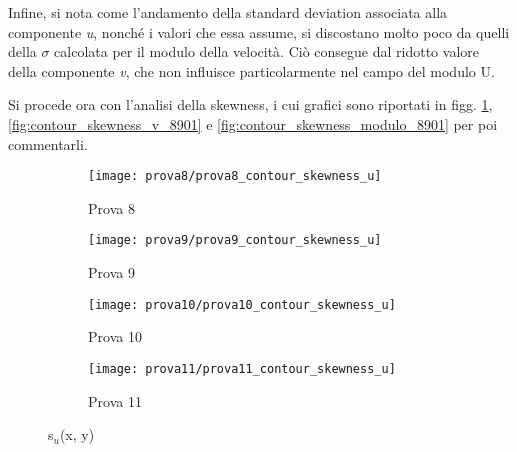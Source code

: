 \documentclass{article} %
\begin{document}
Infine, si nota come l'andamento della standard deviation associata alla componente \textit{u}, nonché i valori che essa assume, si discostano molto poco da quelli della $\sigma$ calcolata per il modulo della velocità. Ciò consegue dal ridotto valore della componente \textit{v}, che non influisce particolarmente nel campo del modulo U.\par
Si procede ora con l'analisi della skewness, i cui grafici sono riportati in figg. \ref{fig:contour_skewness_u_8901}, \ref{fig:contour_skewness_v_8901} e \ref{fig:contour_skewness_modulo_8901} per poi commentarli.
\begin{figure}[h!]
	\centering
	\begin{subfigure}[b]{0.24\textwidth}
		\texttt{[image: prova8/prova8\_contour\_skewness\_u]}
		\caption{Prova 8}
	\end{subfigure}
	\begin{subfigure}[b]{0.24\textwidth}
		\texttt{[image: prova9/prova9\_contour\_skewness\_u]}
		\caption{Prova 9}
	\end{subfigure}
	\begin{subfigure}[b]{0.24\textwidth}
		\texttt{[image: prova10/prova10\_contour\_skewness\_u]}
		\caption{Prova 10}
	\end{subfigure}
	\begin{subfigure}[b]{0.24\textwidth}
		\texttt{[image: prova11/prova11\_contour\_skewness\_u]}
		\caption{Prova 11}
	\end{subfigure}
	\caption{s$_u$(x, y)}
	\label{fig:contour_skewness_u_8901}
\end{figure}
\end{document}

